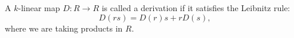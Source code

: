 A $k$-linear map $D\colon R\to R$ is called a derivation if it satisfies
the Leibnitz rule:
\[ D(rs) = D(r)s + rD(s), \]
where we are taking products in $R$.
